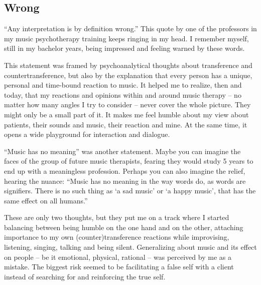 \documentclass[authordate, empirical, issue]{jote-new-article}
\author[1]{\mbox{Nele Fiers\orcid{0000-0002-8394-8598}}}
\affil[1]{Kliniek Sint-Jozef Pittem - Muze op maat}
\begin{document}
\begin{frontmatter}
  \maketitle
  \begin{abstract}
    \printabstracttext
  \end{abstract}
\end{frontmatter}


\setcounter{page}{31}

\subsection{Wrong}

“Any interpretation is by definition wrong.” This quote by one of the professors in my music psychotherapy training keeps ringing in my head. I remember myself, still in my bachelor years, being impressed and feeling warned by these words.



This statement was framed by psychoanalytical thoughts about transference and countertransference, but also by the explanation that every person has a unique, personal and time-bound reaction to music. It helped me to realize, then and today, that my reactions and opinions within and around music therapy -- no matter how many angles I try to consider -- never cover the whole picture. They might only be a small part of it. It makes me feel humble about my view about patients, their sounds and music, their reaction and mine. At the same time, it opens a wide playground for interaction and dialogue.



“Music has no meaning” was another statement. Maybe you can imagine the faces of the group of future music therapists, fearing they would study 5 years to end up with a meaningless profession. Perhaps you can also imagine the relief, hearing the nuance: “Music has no meaning in the way words do, as words are signifiers. There is no such thing as ‘a sad music' or ‘a happy music', that has the same effect on all humans.”



These are only two thoughts, but they put me on a track where I started balancing between being humble on the one hand and on the other, attaching importance to my own (counter)transference reactions while improvising, listening, singing, talking and being silent. Generalizing about music and its effect on people -- be it emotional, physical, rational -- was perceived by me as a mistake. The biggest risk seemed to be facilitating a false self with a client instead of searching for and reinforcing the true self.
\end{document}
